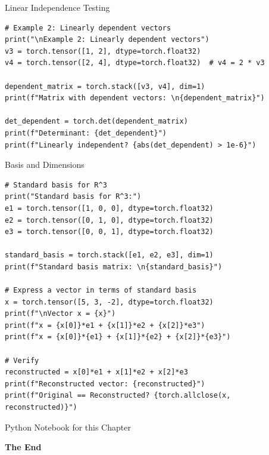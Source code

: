 \documentclass[aspectratio=169,xcolor=dvipsnames,svgnames,x11names,fleqn]{beamer}
\begin{document}
\begin{frame}[containsverbatim]{Linear Independence Testing}
\begin{verbatim}
# Example 2: Linearly dependent vectors
print("\nExample 2: Linearly dependent vectors")
v3 = torch.tensor([1, 2], dtype=torch.float32)
v4 = torch.tensor([2, 4], dtype=torch.float32)  # v4 = 2 * v3

dependent_matrix = torch.stack([v3, v4], dim=1)
print(f"Matrix with dependent vectors: \n{dependent_matrix}")

det_dependent = torch.det(dependent_matrix)
print(f"Determinant: {det_dependent}")
print(f"Linearly independent? {abs(det_dependent) > 1e-6}")
\end{verbatim}
\end{frame}


\begin{frame}[containsverbatim]{Basis and Dimensions}
\begin{verbatim}
# Standard basis for R^3
print("Standard basis for R^3:")
e1 = torch.tensor([1, 0, 0], dtype=torch.float32)
e2 = torch.tensor([0, 1, 0], dtype=torch.float32)
e3 = torch.tensor([0, 0, 1], dtype=torch.float32)

standard_basis = torch.stack([e1, e2, e3], dim=1)
print(f"Standard basis matrix: \n{standard_basis}")

# Express a vector in terms of standard basis
x = torch.tensor([5, 3, -2], dtype=torch.float32)
print(f"\nVector x = {x}")
print(f"x = {x[0]}*e1 + {x[1]}*e2 + {x[2]}*e3")
print(f"x = {x[0]}*{e1} + {x[1]}*{e2} + {x[2]}*{e3}")

# Verify
reconstructed = x[0]*e1 + x[1]*e2 + x[2]*e3
print(f"Reconstructed vector: {reconstructed}")
print(f"Original == Reconstructed? {torch.allclose(x, reconstructed)}")

\end{verbatim}
\end{frame}

    \begin{frame}[containsverbatim]{Python Notebook for this Chapter}
    \begin{center}
    \small
    { }
    
    \end{center}
    \end{frame}
    

\begin{frame}
    \Huge{\centerline{\color{bubblegumPink}\textbf{The End}}}
\end{frame}
\end{document}
